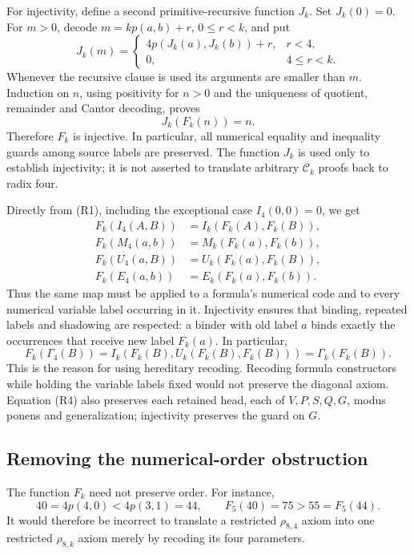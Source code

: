 For injectivity, define a second primitive-recursive function $J_k$.
Set $J_k(0)=0$. For $m>0$, decode
$m=kp(a,b)+r$, $0\leq r<k$, and put
\[
 J_k(m)=
 \begin{cases}
  4p(J_k(a),J_k(b))+r,&r<4,\\
  0,&4\leq r<k.
 \end{cases}                                           \tag{R2}
\]
Whenever the recursive clause is used its arguments are smaller than
$m$. Induction on $n$, using positivity for $n>0$ and the uniqueness
of quotient, remainder and Cantor decoding, proves
\[
 J_k(F_k(n))=n.                                         \tag{R3}
\]
Therefore $F_k$ is injective. In particular, all numerical equality
and inequality guards among source labels are preserved. The function
$J_k$ is used only to establish injectivity; it is not asserted to
translate arbitrary $\mathcal C_k$ proofs back to radix four.

Directly from (R1), including the exceptional case $I_4(0,0)=0$, we get
\begin{align*}
 F_k(I_4(A,B))&=I_k(F_k(A),F_k(B)),\\
 F_k(M_4(a,b))&=M_k(F_k(a),F_k(b)),\\
 F_k(U_4(a,B))&=U_k(F_k(a),F_k(B)),\\
 F_k(E_4(a,b))&=E_k(F_k(a),F_k(b)).             \tag{R4}
\end{align*}
Thus the same map must be applied to a formula's numerical code and
to every numerical variable label occurring in it. Injectivity ensures
that binding, repeated labels and shadowing are respected: a binder
with old label $a$ binds exactly the occurrences that receive new
label $F_k(a)$. In particular,
\[
 F_k(\Gamma_4(B))
   =I_k(F_k(B),U_k(F_k(B),F_k(B)))
   =\Gamma_k(F_k(B)).                                  \tag{R5}
\]
This is the reason for using hereditary recoding. Recoding formula
constructors while holding the variable labels fixed would not
preserve the diagonal axiom. Equation (R4) also preserves each
retained head, each of $V,P,S,Q,G$, modus ponens and generalization;
injectivity preserves the guard on $G$.

\subsection{Removing the numerical-order obstruction}

The function $F_k$ need not preserve order. For instance,
\[
 40=4p(4,0)<4p(3,1)=44,
 \qquad F_5(40)=75>55=F_5(44).
\]
It would therefore be incorrect to translate a restricted
$\rho_{8,4}$ axiom into one restricted $\rho_{8,k}$ axiom merely
by recoding its four parameters.

